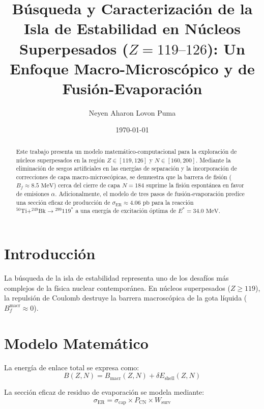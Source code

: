 \documentclass[twocolumn,aps,prc,preprintnumbers,fontsize=10pt,floatfix]{revtex4-1}
\begin{document}
\title{Búsqueda y Caracterización de la Isla de Estabilidad en Núcleos Superpesados ($Z=119\text{--}126$): Un Enfoque Macro-Microscópico y de Fusión-Evaporación}

\author{Neyen Aharon Lovon Puma}
\date{\today}

\begin{abstract}
Este trabajo presenta un modelo matem\'atico-computacional para la exploraci\'on de n\'ucleos superpesados en la regi\'on $Z \in [119, 126]$ y $N \in [160, 200]$. Mediante la eliminaci\'on de sesgos artificiales en las energ\'ias de separaci\'on y la incorporaci\'on de correcciones de capa macro-microsc\'opicas, se demuestra que la barrera de fisi\'on ($B_f \approx 8.5\text{ MeV}$) cerca del cierre de capa $N=184$ suprime la fisi\'on espont\'anea en favor de emisiones $\alpha$. Adicionalmente, el modelo de tres pasos de fusi\'on-evaporaci\'on predice una secci\'on eficaz de producci\'on de $\sigma_{\text{ER}} \approx 4.06\text{ pb}$ para la reacci\'on $^{50}\text{Ti} + ^{249}\text{Bk} \rightarrow {}^{299}119^*$ a una energ\'ia de excitaci\'on \'optima de $E^* = 34.0\text{ MeV}$.
\end{abstract}

\maketitle

\section{Introducci\'on}
La b\'usqueda de la isla de estabilidad representa uno de los desaf\'ios m\'as complejos de la f\'isica nuclear contempor\'anea. En n\'ucleos superpesados ($Z \ge 119$), la repulsi\'on de Coulomb destruye la barrera macrosc\'opica de la gota l\'iquida ($B_f^{\text{macr}} \approx 0$).

\section{Modelo Matem\'atico}
La energ\'ia de enlace total se expresa como:
\begin{equation}
B(Z,N) = B_{\text{macr}}(Z,N) + \delta E_{\text{shell}}(Z,N)
\end{equation}

La secci\'on eficaz de residuo de evaporaci\'on se modela mediante:
\begin{equation}
\sigma_{\text{ER}} = \sigma_{\text{cap}} \times P_{\text{CN}} \times W_{\text{surv}}
\end{equation}
\end{document}
